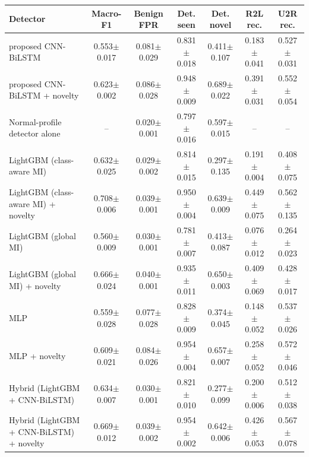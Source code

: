 \begin{tabular}{lcccccc}
\toprule
Detector & Macro-F1 & Benign FPR & Det. seen & Det. novel & R2L rec. & U2R rec. \\
\midrule
proposed CNN-BiLSTM & 0.553$\pm$0.017 & 0.081$\pm$0.029 & 0.831$\pm$0.018 & 0.411$\pm$0.107 & 0.183$\pm$0.041 & 0.527$\pm$0.031 \\
proposed CNN-BiLSTM + novelty & 0.623$\pm$0.002 & 0.086$\pm$0.028 & 0.948$\pm$0.009 & 0.689$\pm$0.022 & 0.391$\pm$0.031 & 0.552$\pm$0.054 \\
Normal-profile detector alone & -- & 0.020$\pm$0.001 & 0.797$\pm$0.016 & 0.597$\pm$0.015 & -- & -- \\
LightGBM (class-aware MI) & 0.632$\pm$0.025 & 0.029$\pm$0.002 & 0.814$\pm$0.015 & 0.297$\pm$0.135 & 0.191$\pm$0.004 & 0.408$\pm$0.075 \\
LightGBM (class-aware MI) + novelty & 0.708$\pm$0.006 & 0.039$\pm$0.001 & 0.950$\pm$0.004 & 0.639$\pm$0.009 & 0.449$\pm$0.075 & 0.562$\pm$0.135 \\
LightGBM (global MI) & 0.560$\pm$0.009 & 0.030$\pm$0.001 & 0.781$\pm$0.007 & 0.413$\pm$0.087 & 0.076$\pm$0.012 & 0.264$\pm$0.023 \\
LightGBM (global MI) + novelty & 0.666$\pm$0.024 & 0.040$\pm$0.001 & 0.935$\pm$0.011 & 0.650$\pm$0.003 & 0.409$\pm$0.069 & 0.428$\pm$0.017 \\
MLP & 0.559$\pm$0.028 & 0.077$\pm$0.028 & 0.828$\pm$0.009 & 0.374$\pm$0.045 & 0.148$\pm$0.052 & 0.537$\pm$0.026 \\
MLP + novelty & 0.609$\pm$0.021 & 0.084$\pm$0.026 & 0.954$\pm$0.004 & 0.657$\pm$0.007 & 0.258$\pm$0.052 & 0.572$\pm$0.046 \\
Hybrid (LightGBM + CNN-BiLSTM) & 0.634$\pm$0.007 & 0.030$\pm$0.001 & 0.821$\pm$0.010 & 0.277$\pm$0.099 & 0.200$\pm$0.006 & 0.512$\pm$0.038 \\
Hybrid (LightGBM + CNN-BiLSTM) + novelty & 0.669$\pm$0.012 & 0.039$\pm$0.002 & 0.954$\pm$0.002 & 0.642$\pm$0.006 & 0.426$\pm$0.053 & 0.567$\pm$0.078 \\
\bottomrule
\end{tabular}

